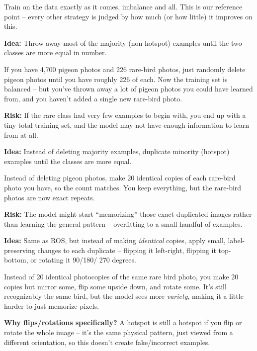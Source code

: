 \documentclass[11pt]{article}
\begin{document}
\begin{keyidea}
Train on the data exactly as it comes, imbalance and all. This is our
reference point -- every other strategy is judged by how much (or how
little) it improves on this.
\end{keyidea}

\begin{keyidea}
\textbf{Idea:} Throw away most of the majority (non-hotspot) examples
until the two classes are more equal in number.
\begin{analogy}
If you have 4,700 pigeon photos and 226 rare-bird photos, just
randomly delete pigeon photos until you have roughly 226 of each. Now
the training set is balanced -- but you've thrown away a lot of
pigeon photos you could have learned from, and you haven't added a
single new rare-bird photo.
\end{analogy}
\textbf{Risk:} If the rare class had very few examples to begin with,
you end up with a tiny total training set, and the model may not have
enough information to learn from at all.
\end{keyidea}

\begin{keyidea}
\textbf{Idea:} Instead of deleting majority examples, duplicate
minority (hotspot) examples until the classes are more equal.
\begin{analogy}
Instead of deleting pigeon photos, make 20 identical copies of each
rare-bird photo you have, so the count matches. You keep everything,
but the rare-bird photos are now exact repeats.
\end{analogy}
\textbf{Risk:} The model might start ``memorizing'' those exact
duplicated images rather than learning the general pattern --
overfitting to a small handful of examples.
\end{keyidea}

\begin{keyidea}
\textbf{Idea:} Same as ROS, but instead of making \emph{identical}
copies, apply small, label-preserving changes to each duplicate --
flipping it left-right, flipping it top-bottom, or rotating it 90/180/
270 degrees.
\begin{analogy}
Instead of 20 identical photocopies of the same rare bird photo, you
make 20 copies but mirror some, flip some upside down, and rotate
some. It's still recognizably the same bird, but the model sees more
\emph{variety}, making it a little harder to just memorize pixels.
\end{analogy}
\textbf{Why flips/rotations specifically?} A hotspot is still a
hotspot if you flip or rotate the whole image -- it's the same
physical pattern, just viewed from a different orientation, so this
doesn't create fake/incorrect examples.
\end{keyidea}
\end{document}

